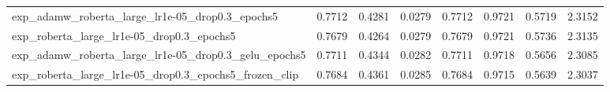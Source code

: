\documentclass[a4paper,oneside,bibliography=totoc]{scrbook}
\begin{document}
\begin{landscape}
\begin{center}
\begin{longtable}{p{4cm} *{7}{r}}
        exp\_adamw\_roberta\_large\_lr1e-05\_drop0.3\_epochs5 & 0.7712 & 0.4281 & 0.0279 & 0.7712 & 0.9721 & 0.5719 & 2.3152 \\ 
        exp\_roberta\_large\_lr1e-05\_drop0.3\_epochs5 & 0.7679 & 0.4264 & 0.0279 & 0.7679 & 0.9721 & 0.5736 & 2.3135 \\ 
        exp\_adamw\_roberta\_large\_lr1e-05\_drop0.3\_gelu\_epochs5 & 0.7711 & 0.4344 & 0.0282 & 0.7711 & 0.9718 & 0.5656 & 2.3085 \\ 
        exp\_roberta\_large\_lr1e-05\_drop0.3\_epochs5\_frozen\_clip & 0.7684 & 0.4361 & 0.0285 & 0.7684 & 0.9715 & 0.5639 & 2.3037 \\ 

\end{longtable}
\end{center}
\end{landscape}

\scriptsize  %
\setlength{\tabcolsep}{2pt}  %
\end{document}
